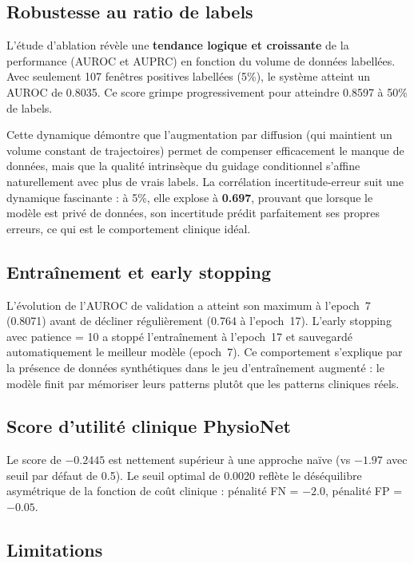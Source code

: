 \documentclass[11pt,a4paper]{article}
\begin{document}
\subsection{Robustesse au ratio de labels}

L'étude d'ablation révèle une \textbf{tendance logique et croissante} de la performance
(AUROC et AUPRC) en fonction du volume de données labellées. Avec seulement 107 fenêtres
positives labellées (5\%), le système atteint un AUROC de 0.8035. Ce score grimpe
progressivement pour atteindre 0.8597 à 50\% de labels.

Cette dynamique démontre que l'augmentation par diffusion (qui maintient un volume
constant de trajectoires) permet de compenser efficacement le manque de données, mais
que la qualité intrinsèque du guidage conditionnel s'affine naturellement avec plus
de vrais labels. La corrélation incertitude-erreur suit une dynamique fascinante :
à 5\%, elle explose à \textbf{0.697}, prouvant que lorsque le modèle est privé de
données, son incertitude prédit parfaitement ses propres erreurs, ce qui est le
comportement clinique idéal.

\subsection{Entraînement et early stopping}

L'évolution de l'AUROC de validation a atteint son maximum à l'epoch~7 (0.8071)
avant de décliner régulièrement (0.764 à l'epoch~17). L'early stopping avec
patience = 10 a stoppé l'entraînement à l'epoch~17 et sauvegardé automatiquement
le meilleur modèle (epoch~7). Ce comportement s'explique par la présence de
données synthétiques dans le jeu d'entraînement augmenté : le modèle finit par
mémoriser leurs patterns plutôt que les patterns cliniques réels.

\subsection{Score d'utilité clinique PhysioNet}

Le score de \textbf{$-0.2445$} est nettement supérieur à une approche naïve
(vs $-1.97$ avec seuil par défaut de 0.5). Le seuil optimal de 0.0020 reflète le
déséquilibre asymétrique de la fonction de coût clinique : pénalité FN = $-2.0$,
pénalité FP = $-0.05$.

\subsection{Limitations}
\end{document}

